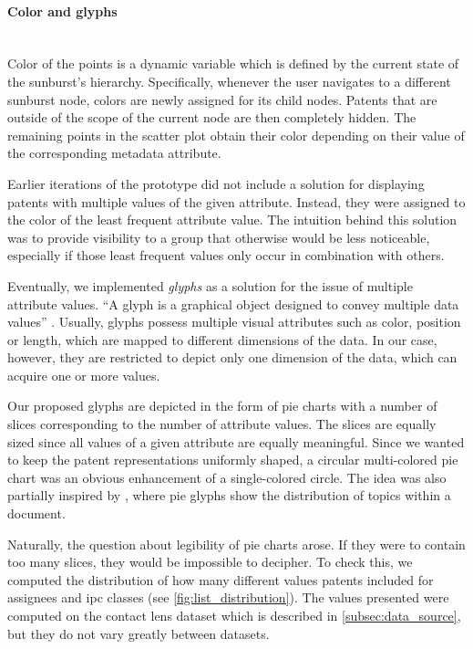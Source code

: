 \paragraph{Color and glyphs}~\\
Color of the points is a dynamic variable which is defined by the current state of the sunburst's hierarchy.
Specifically, whenever the user navigates to a different sunburst node, colors are newly assigned for its child nodes.
Patents that are outside of the scope of the current node are then completely hidden.
The remaining points in the scatter plot obtain their color depending on their value of the corresponding metadata attribute.

Earlier iterations of the prototype did not include a solution for displaying patents with multiple values of the given attribute.
Instead, they were assigned to the color of the least frequent attribute value.
The intuition behind this solution was to provide visibility to a group that otherwise would be less noticeable, especially if those least frequent values only occur in combination with others.

Eventually, we implemented \textit{glyphs} as a solution for the issue of multiple attribute values.
``A glyph is a graphical object designed to convey multiple data values'' \cite{ware2004information}.
Usually, glyphs possess multiple visual attributes such as color, position or length, which are mapped to different dimensions of the data.
In our case, however, they are restricted to depict only one dimension of the data, which can acquire one or more values.

Our proposed glyphs are depicted in the form of pie charts with a number of slices corresponding to the number of attribute values.
The slices are equally sized since all values of a given attribute are equally meaningful.
Since we wanted to keep the patent representations uniformly shaped, a circular multi-colored pie chart was an obvious enhancement of a single-colored circle.
The idea was also partially inspired by \cite{Dou2011}, where pie glyphs show the distribution of topics within a document. 

Naturally, the question about legibility of pie charts arose. 
If they were to contain too many slices, they would be impossible to decipher.
To check this, we computed the distribution of how many different values patents included for assignees and \gls{ipc} classes (see \autoref{fig:list_distribution}).
The values presented were computed on the contact lens dataset which is described in \autoref{subsec:data_source}, but they do not vary greatly between datasets.

